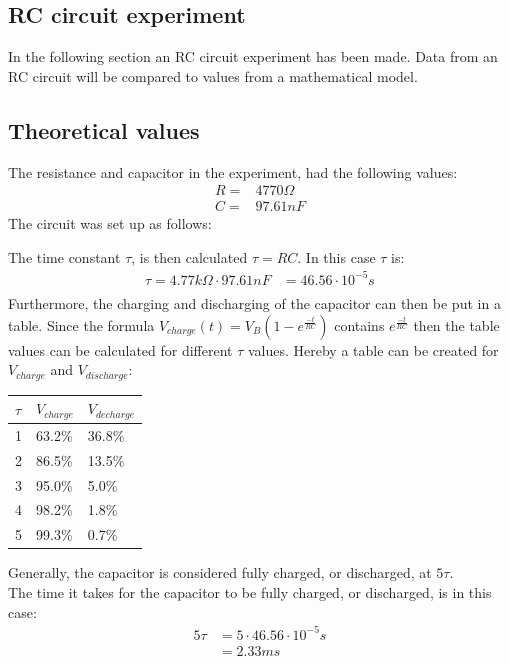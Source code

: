 \subsection{RC circuit experiment}
In the following section an RC circuit experiment has been made. Data from an RC circuit will be compared to values from a mathematical model.
\subsection{Theoretical values}
The resistance and capacitor in the experiment, had the following values:
\begin{align*}
 R =& 4770\Omega \\
 C =& 97.61nF
\end{align*}
The circuit was set up as follows:
\begin{figure}[H]
	
\end{figure}
The time constant $\tau$, is then calculated $\tau = RC$. In this case $\tau$ is:
\begin{align*}
	\tau = 4.77 k\Omega \cdot 97.61 nF &= 46.56 \cdot 10^{-5} s \\
\end{align*}
Furthermore, the charging and discharging of the capacitor can then be put in a table. Since the formula $V_{charge}(t)=V_B(1-e^{\frac{-t}{RC}})$ contains $e^{\frac{-t}{RC}}$ then the table values can be calculated for different $\tau$ values. Hereby a table can be created for $V_{charge}$ and $V_{discharge}$:
\begin{table}[H]
\center
\begin{tabular}{|l|l|l|}
\hline
$\tau$ & $V_{charge}$ & $V_{decharge}$ \\ \hline
1      & 63.2\%       & 36.8\%         \\ \hline
2      & 86.5\%       & 13.5\%         \\ \hline
3      & 95.0\%       & 5.0\%          \\ \hline
4      & 98.2\%       & 1.8\%          \\ \hline
5      & 99.3\%       & 0.7\%          \\ \hline
\end{tabular}
\end{table}
Generally, the capacitor is considered fully charged, or discharged, at $5\tau$. \\
The time it takes for the capacitor to be fully charged, or discharged, is in this case:
\begin{align*}
5\tau &= 5 \cdot 46.56 \cdot 10^{-5} s \\
&= 2.33 ms
\end{align*}
\newpage
